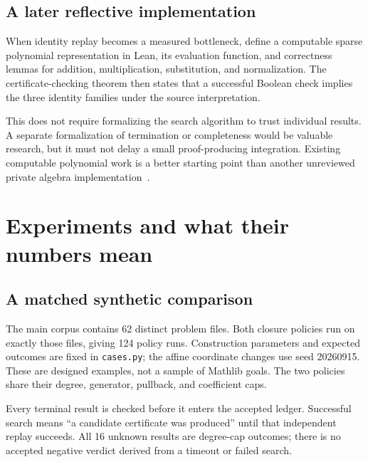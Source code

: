 \documentclass[11pt,letterpaper]{article}
\theoremstyle{definition}
\newcommand{\code}[1]{\nolinkurl{#1}}
\begin{document}
\subsection{A later reflective implementation}
When identity replay becomes a measured bottleneck, define a computable sparse
polynomial representation in Lean, its evaluation function, and correctness
lemmas for addition, multiplication, substitution, and normalization. The
certificate-checking theorem then states that a successful Boolean check
implies the three identity families under the source interpretation.

This does not require formalizing the search algorithm to trust individual
results. A separate formalization of termination or completeness would be
valuable research, but it must not delay a small proof-producing integration.
Existing computable polynomial work is a better starting point than another
unreviewed private algebra implementation~\cite{groebner-tactics}.

\section{Experiments and what their numbers mean}
\label{sec:experiments}

\subsection{A matched synthetic comparison}
The main corpus contains 62 distinct problem files. Both closure policies run
on exactly those files, giving 124 policy runs. Construction parameters and
expected outcomes are fixed in \code{cases.py}; the affine coordinate changes
use seed 20260915. These are designed examples, not a sample of Mathlib goals.
The two policies share their degree, generator, pullback, and coefficient caps.

Every terminal result is checked before it enters the accepted ledger.
Successful search means ``a candidate certificate was produced'' until that
independent replay succeeds. All 16 unknown results are degree-cap outcomes;
there is no accepted negative verdict derived from a timeout or failed search.
\end{document}
